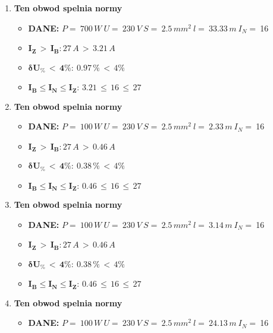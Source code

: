 \begin{enumerate}
\begin{itemize}
\end{itemize}
\item \textcolor{Green}{\cmark} \textbf{Ten obwod spelnia normy} 
\begin{itemize}
\item[] \textbf{DANE: } \: $ P = \:700\, W\: U = \:230\: V\: S = \:2.5\, mm^2\: l = \:33.33\, m\: I_N= \: $16
\item[\textcolor{Green}{\cmark}] $ \pmb{I_Z \, >  \, I_B: }27 \, A \, > \,3.21 \, A $
\item[\textcolor{Green}{\cmark}] $ \pmb{ \delta U_\% \, < \, 4\%:} \:0.97 \, \% \,< \, 4\% $
\item[\textcolor{Green}{\cmark}] $ \pmb{I_B \le I_N \le I_Z: } \, 3.21 \, \le \,16 \, \le \,27 $
\end{itemize}
\item \textcolor{Green}{\cmark} \textbf{Ten obwod spelnia normy} 
\begin{itemize}
\item[] \textbf{DANE: } \: $ P = \:100\, W\: U = \:230\: V\: S = \:2.5\, mm^2\: l = \:2.33\, m\: I_N= \: $16
\item[\textcolor{Green}{\cmark}] $ \pmb{I_Z \, >  \, I_B: }27 \, A \, > \,0.46 \, A $
\item[\textcolor{Green}{\cmark}] $ \pmb{ \delta U_\% \, < \, 4\%:} \:0.38 \, \% \,< \, 4\% $
\item[\textcolor{Green}{\cmark}] $ \pmb{I_B \le I_N \le I_Z: } \, 0.46 \, \le \,16 \, \le \,27 $
\end{itemize}
\item \textcolor{Green}{\cmark} \textbf{Ten obwod spelnia normy} 
\begin{itemize}
\item[] \textbf{DANE: } \: $ P = \:100\, W\: U = \:230\: V\: S = \:2.5\, mm^2\: l = \:3.14\, m\: I_N= \: $16
\item[\textcolor{Green}{\cmark}] $ \pmb{I_Z \, >  \, I_B: }27 \, A \, > \,0.46 \, A $
\item[\textcolor{Green}{\cmark}] $ \pmb{ \delta U_\% \, < \, 4\%:} \:0.38 \, \% \,< \, 4\% $
\item[\textcolor{Green}{\cmark}] $ \pmb{I_B \le I_N \le I_Z: } \, 0.46 \, \le \,16 \, \le \,27 $
\end{itemize}
\item \textcolor{Green}{\cmark} \textbf{Ten obwod spelnia normy} 
\begin{itemize}
\item[] \textbf{DANE: } \: $ P = \:100\, W\: U = \:230\: V\: S = \:2.5\, mm^2\: l = \:24.13\, m\: I_N= \: $16

\end{itemize}
\end{enumerate}
